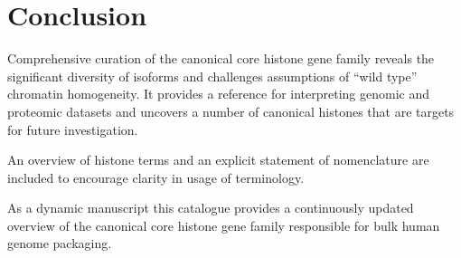 \section{Conclusion}
\label{sec:conclusion}

	Comprehensive curation of the canonical core histone gene family 
	reveals the significant diversity of isoforms 
	and challenges assumptions of ``wild type'' chromatin homogeneity.
	It provides a reference for interpreting genomic and proteomic datasets
	and uncovers a number of canonical histones that are targets for future investigation.

	An overview of histone terms and an explicit statement of nomenclature 
	are included to encourage clarity in usage of terminology.

	As a dynamic manuscript this catalogue provides a continuously updated overview 
	of the canonical core histone gene family responsible for bulk human genome packaging.